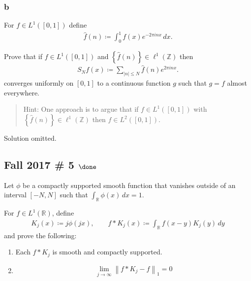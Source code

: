 \hypertarget{b-11}{%
\subsubsection{b}\label{b-11}}

For \(f\in L^1([0, 1])\) define
\begin{align*}
\widehat{f}(n) \coloneqq\int _0^1 f(x) e^{-2\pi i n x} \, dx
.\end{align*}

Prove that if \(f\in L^1([0, 1])\) and
\(\left\{{\widehat{f}(n)}\right\} \in \ell^1({\mathbb{Z}})\) then
\begin{align*}
S_N f(x) \coloneqq\sum_{{\left\lvert {n} \right\rvert} \leq N} \widehat{f} (n) e^{2 \pi i n x}
.\end{align*}
converges uniformly on \([0, 1]\) to a continuous function \(g\) such
that \(g = f\) almost everywhere.

\begin{quote}
Hint: One approach is to argue that if \(f\in L^1([0, 1])\) with
\(\left\{{\widehat{f} (n)}\right\} \in \ell^1({\mathbb{Z}})\) then
\(f\in L^2([0, 1])\).
\end{quote}

Solution omitted.

\hypertarget{fall-2017-5-done}{%
\subsection{\texorpdfstring{Fall 2017 \# 5
\(\done\)}{Fall 2017 \# 5 \textbackslash done}}\label{fall-2017-5-done}}

Let \(\phi\) be a compactly supported smooth function that vanishes
outside of an interval \([-N, N]\) such that
\(\int _{{\mathbb{R}}} \phi(x) \, dx = 1\).

For \(f\in L^1({\mathbb{R}})\), define
\begin{align*}
K_{j}(x) \coloneqq j \phi(j x), 
\qquad 
f \ast K_{j}(x) \coloneqq\int_{{\mathbb{R}}} f(x-y) K_{j}(y) \, dy
\end{align*}
and prove the following:

\begin{enumerate}
\def\labelenumi{\arabic{enumi}.}
\item
  Each \(f\ast K_j\) is smooth and compactly supported.
\item

  \begin{align*}
  \lim _{j \to \infty} {\left\lVert {f * K_{j}-f} \right\rVert}_{1} = 0
  \end{align*}
\end{enumerate}

